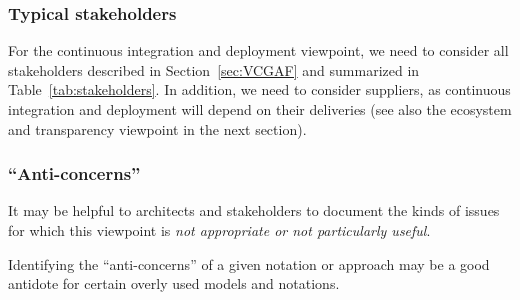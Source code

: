 
\subsubsection{Typical stakeholders} 

For the continuous integration and deployment viewpoint, we need to consider all stakeholders described in Section~\ref{sec:VCGAF} and summarized in Table~\ref{tab:stakeholders}.
In addition, we need to consider suppliers, as continuous integration and deployment will depend on their deliveries (see also the ecosystem and transparency viewpoint in the next section).


\subsubsection{``Anti-concerns'' \Optional} 

It may be helpful to architects and stakeholders to
document the kinds of issues for which this viewpoint is \emph{not
  appropriate or not particularly useful}.

Identifying the ``anti-concerns'' of a given notation or approach may
be a good antidote for certain overly used models and notations.




